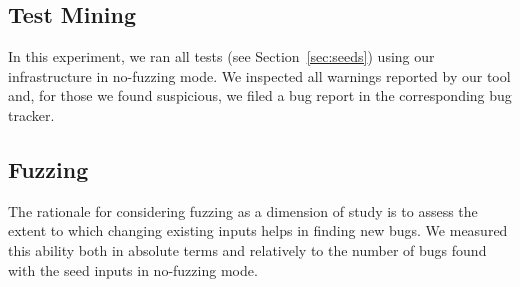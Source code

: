 \documentclass[10pt,conference,anonymous]{IEEEtran}
\begin{document}
\subsection{Test Mining}

In this experiment, we ran all tests (see Section~\ref{sec:seeds})
using our infrastructure in no-fuzzing mode. We inspected all warnings
reported by our tool and, for those we found suspicious, we filed a
bug report in the corresponding bug tracker.





\subsection{Fuzzing}

The rationale for considering fuzzing as a dimension of study is to
assess the extent to which changing existing inputs helps in finding
new bugs. We measured this ability both in absolute terms and
relatively to the number of bugs found with the seed inputs in
no-fuzzing mode.
\end{document}
